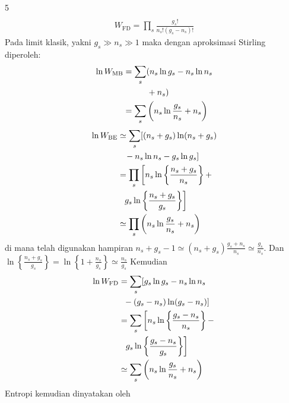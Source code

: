 \documentclass[a4paper  , 6 pt]{article}
\begin{document}
\begin{tiny}
\begin{multicols} {5}
\begin{align}
\end{align}
\begin{align}
W_\mathrm{FD} = \prod_s \frac{g_s! }{n_s ! (g_s - n_s )!} 
\end{align}
Pada limit klasik, yakni $g_s \gg n_s \gg 1$ maka dengan aproksimasi Stirling diperoleh:
\begin{align}
\ln W_\mathrm{MB}& = \sum_s (n_s \ln g_s  - n_s \ln n_s
 \nonumber \\ 
 &\hspace{1 cm } 
 + n_s ) \nonumber \\
& = \sum_s \left( n_s \ln \frac{g_s }{n_s } + n_s  \right)
\end{align}
\begin{align}
\ln W_\mathrm{BE} &\simeq \sum_s [ (n_s + g_s )\ln (n_s + g_s )\nonumber \\ 
&  \hspace{0.3 cm } - n_s \ln n_s - g_s \ln g_s ] \nonumber \\
&  = \prod_s \left [ n_s \ln \left \lbrace  \frac{n_s + g_s }{n_s }\right \rbrace + \right. \nonumber \\
& \hspace{0.2 cm } \left. g_s \ln \left \lbrace  \frac{n_s + g_s}{g_s }\right \rbrace \right ] \nonumber \\
& \simeq \prod_s \left( n_s \ln \frac{g_s }{n_s } + n_s \right)
\end{align}
di mana telah  digunakan hampiran $n_s + g_s - 1 \simeq (n_s + g_s ) \frac{g_s + n_s }{n_s } \simeq \frac{g_s }{n_s }$. Dan $\ln \left \lbrace \frac{n_s + g_s }{g_s} \right \rbrace  = \ln \left \lbrace  1 + \frac{n_s }{g_s } 
\right \rbrace \simeq \frac{n_s }{g_s }$ \newline  Kemudian
\begin{align}
\ln W_\mathrm{FD}& = \sum_s [ g_s \ln g_s - n_s \ln n_s  \nonumber \\
& \hspace{0.2 cm } - (g_s - n_s )\ln (g_s -n_s) ] \nonumber \\
& = \sum_s \left [ n_s \ln \left \lbrace  \frac{g_s - n_s }{n_s }\right \rbrace   - \right. \nonumber
 \\
& \hspace{0.2 cm } \left. g_s \ln \left \lbrace \frac{g_s - n_s }{g_s } \right \rbrace \right ] \nonumber \\
& \simeq \sum_s \left( n_s \ln \frac{g_s }{n_s } + n_s \right) 
\end{align}
Entropi kemudian dinyatakan oleh 
\begin{align}

\end{align}
\end{multicols}
\end{tiny}
\end{document}
